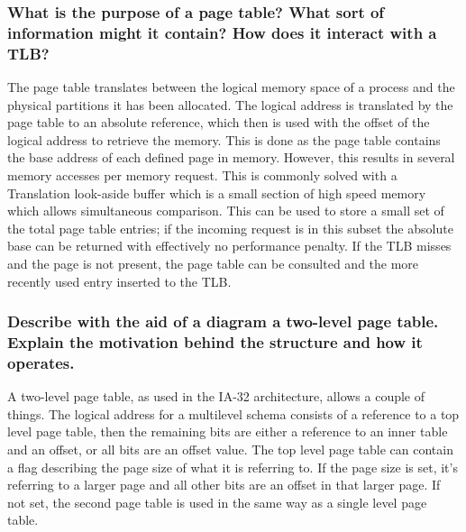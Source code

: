 \documentclass[]{article}
\begin{document}
        \subsubsection{What is the purpose of a page table? What sort of information might it contain? How does it interact with a TLB?}

        The page table translates between the logical memory space of a process and the physical partitions it has been allocated. The logical address is translated by the page table to an absolute reference, which then is used with the offset of the logical address to retrieve the memory. This is done as the page table contains the base address of each defined page in memory. However, this results in several memory accesses per memory request. This is commonly solved with a Translation look-aside buffer which is a small section of high speed memory which allows simultaneous comparison. This can be used to store a small set of the total page table entries; if the incoming request is in this subset the absolute base can be returned with effectively no performance penalty. If the TLB misses and the page is not present, the page table can be consulted and the more recently used entry inserted to the TLB.

        \subsubsection{Describe with the aid of a diagram a two-level page table. Explain the motivation behind the structure and how it operates.}

        A two-level page table, as used in the IA-32 architecture, allows a couple of things. The logical address for a multilevel schema consists of a reference to a top level page table, then the remaining bits are either a reference to an inner table and an offset, or all bits are an offset value. The top level page table can contain a flag describing the page size of what it is referring to. If the page size is set, it's referring to a larger page and all other bits are an offset in that larger page. If not set, the second page table is used in the same way as a single level page table.
\end{document}
